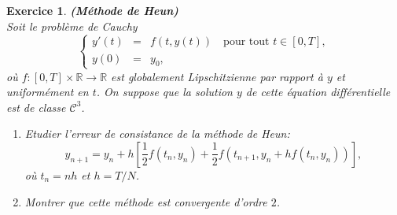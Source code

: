 \documentclass[11pt]{article}
\newcommand{\R}{\ensuremath{\mathbb R}}
\theoremstyle{exostyle}
\newtheorem{exercice}{Exercice}
\begin{document}
%
\begin{exercice}{\bf (Méthode de Heun)}\\
Soit le problème de Cauchy
$$\left\{
\begin{array}{rcl}
y'(t) & = & f(t,y(t)) \quad \text{pour tout } t \in [0,T],\\
y(0) & = & y_0,
\end{array}
\right.$$
où $f:[0,T] \times \R \to \R$ est globalement Lipschitzienne par rapport à $y$ et uniformément en $t$. On suppose que la solution $y$ de cette équation différentielle est de classe $\mathcal C^3$. 
\begin{enumerate}
\item Etudier l'erreur de consistance de la méthode de Heun:
$$y_{n+1}=y_n+h \left[\frac12 f(t_n,y_n) + \frac12f(t_{n+1},y_n+hf(t_n,y_n)) \right],$$
où $t_n=nh$ et $h=T/N$.
\item Montrer que cette méthode est convergente d'ordre $2$.
\end{enumerate}
\end{exercice}
\medskip
\end{document}
